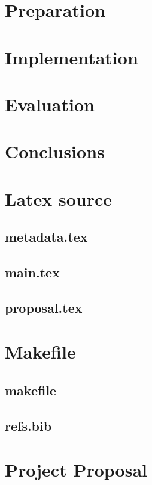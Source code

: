 \documentclass[12pt,a4paper,twoside,openright]{report}
\begin{document}
\chapter{Preparation}

\chapter{Implementation}

\chapter{Evaluation}

\chapter{Conclusions}



\appendix

\chapter{Latex source}

\section{metadata.tex}
{\scriptsize}

\section{main.tex}
{\scriptsize}

\section{proposal.tex}
{\scriptsize}

\chapter{Makefile}

\section{makefile}\label{makefile}
{\scriptsize}

\section{refs.bib}
{\scriptsize}


\chapter{Project Proposal}


\end{document}
